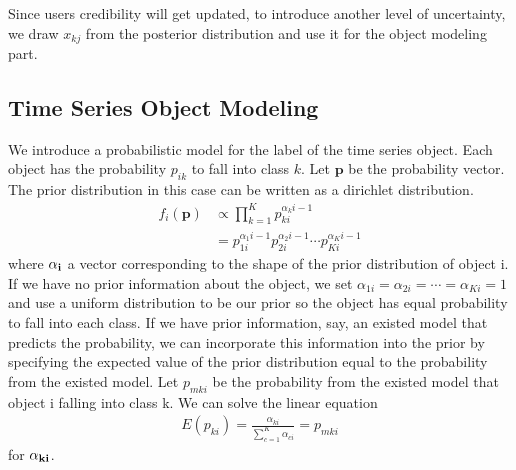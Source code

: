 \documentclass[a4paper,10pt]{article}
\begin{document}
\hspace{0 mm}

\noindent Since users credibility will get updated, to introduce another level of uncertainty, we draw $x_{kj}$ from the posterior distribution and use it for the object modeling part.

\subsection{Time Series Object Modeling}

We introduce a probabilistic model for the label of the time series object. Each object has the probability $p_{ik}$ to fall into class $k$. Let $\textbf{p}$ be the probability vector. The prior distribution in this case can be written as a dirichlet distribution.
\begin{align}
f_{i}(\textbf{p}) &\propto
\prod \limits_{k=1}^{K}p_{ki}^{\alpha_ki-1}\\
&=
p_{1i}^{\alpha_1i-1}p_{2i}^{\alpha_2i-1}\cdots p_{Ki}^{\alpha_Ki-1}
\end{align}
where $\bf{\alpha_i}$ a vector corresponding to the shape of the prior distribution of object i. If we have no prior information about the object, we set $\alpha_{1i} = \alpha_{2i} = \cdots = \alpha_{Ki} = 1$ and use a uniform distribution to be our prior so the object has equal probability to fall into each class. If we have prior information, say, an existed model that predicts the probability, we can incorporate this information into the prior by specifying the expected value of the prior distribution equal to the probability from the existed model. Let $p_{mki}$ be the probability from the existed model that object i falling into class k. We can solve the linear equation
\begin{align}
E(p_{ki}) = \frac{\alpha_{ki}}{\sum \limits_{c=1}^{K}\alpha_{ci}} = p_{mki}
\end{align}
for $\bf{\alpha_{ki}}$.

\hspace{0 mm}
\end{document}
